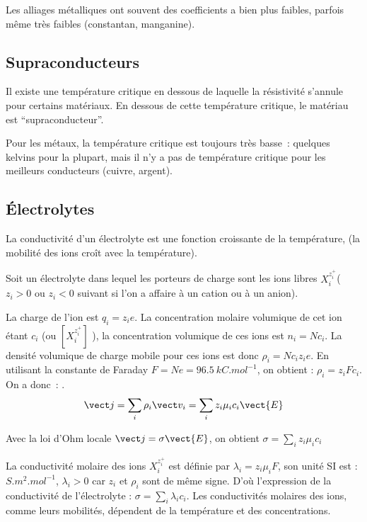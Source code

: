 Les alliages métalliques ont souvent des coefficients a bien plus faibles, parfois même très faibles (constantan, manganine).

\subsection{Supraconducteurs}

Il existe une température critique en dessous de laquelle la résistivité s'annule pour certains matériaux. En dessous de cette température critique, le matériau est ``supraconducteur''.

Pour les métaux, la température critique est toujours très basse~: quelques kelvins pour la plupart, mais il n'y a pas de température critique pour les meilleurs conducteurs (cuivre, argent).

\subsection{Électrolytes}

La conductivité d'un électrolyte est une fonction croissante de la température, (la mobilité des ions croît avec la température).

Soit un électrolyte dans lequel les porteurs de charge sont les ions libres $X_i^{z_i^+}$($z_i > 0$ ou $z_i < 0$ suivant si l'on a affaire à un cation ou à un anion).

La charge de l'ion est $q_i = z_i e$. La concentration molaire volumique de cet ion étant $c_i$ (ou $[X_i^{z_i^+}]$ ), la concentration volumique de ces ions est $n_i = N  c_i$. La densité volumique de charge mobile pour ces ions est donc $\rho_i = N  c_i z_i e$. En utilisant la constante de Faraday $F = N e = \SI{96,5}{kC.mol^{-1}}$, on obtient : $\rho_i = z_i F c_i$. On a donc~: .
\begin{equation}
  \vj = \sum_{i} \rho_i \vv_i = \sum_i z_i \mu_i c_i \vect{E}
\end{equation}

Avec la loi d'Ohm locale $\vj = \sigma \vect{E}$, on obtient  $\sigma = \sum_i z_i \mu_i c_i$

La conductivité molaire des ions $X_i^{z_i^+}$  est définie par $\lambda_i = z_i \mu_i F$, son unité SI est : $\si{S.m^2.mol^{-1}}$, $\lambda_i > 0$ car $z_i$ et $\rho_i$ sont de même signe. D'où l'expression de la conductivité de l'électrolyte : $\sigma = \sum_i \lambda_i c_i$. Les conductivités molaires des ions, comme leurs mobilités, dépendent de la température et des concentrations.

